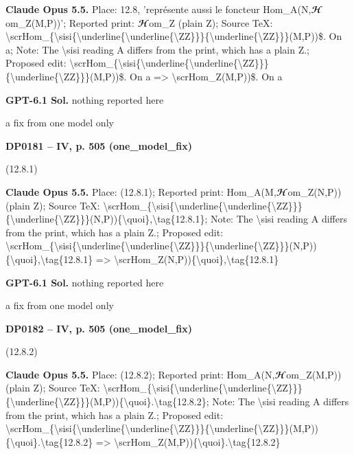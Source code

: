 \textbf{Claude Opus 5.5.} Place: 12.8, 'représente aussi le foncteur Hom\_A(N,\ensuremath{𝓗}om\_Z(M,P))'; Reported print: \ensuremath{𝓗}om\_Z (plain Z); Source TeX: \textbackslash{}scrHom\_\{\textbackslash{}sisi\{\textbackslash{}underline\{\textbackslash{}underline\{\textbackslash{}ZZ\}\}\}\{\textbackslash{}underline\{\textbackslash{}ZZ\}\}\}(M,P))\$. On a; Note: The \textbackslash{}sisi reading A differs from the print, which has a plain Z.; Proposed edit: \textbackslash{}scrHom\_\{\textbackslash{}sisi\{\textbackslash{}underline\{\textbackslash{}underline\{\textbackslash{}ZZ\}\}\}\{\textbackslash{}underline\{\textbackslash{}ZZ\}\}\}(M,P))\$. On a =\allowbreak > \textbackslash{}scrHom\_Z(M,P))\$. On a\par
\textbf{GPT-6.1 Sol.} nothing reported here\par
a fix from one model only\par
\par\noindent\hypertarget{DP0181}{}\textbf{DP0181 -- IV, p. 505 (one\_model\_fix)}\par
(12.8.1)\par
\textbf{Claude Opus 5.5.} Place: (12.8.1); Reported print: Hom\_A(M,\ensuremath{𝓗}om\_Z(N,P)) (plain Z); Source TeX: \textbackslash{}scrHom\_\{\textbackslash{}sisi\{\textbackslash{}underline\{\textbackslash{}underline\{\textbackslash{}ZZ\}\}\}\{\textbackslash{}underline\{\textbackslash{}ZZ\}\}\}(N,P))\{\textbackslash{}quoi\},\textbackslash{}tag\{12.8.1\}; Note: The \textbackslash{}sisi reading A differs from the print, which has a plain Z.; Proposed edit: \textbackslash{}scrHom\_\{\textbackslash{}sisi\{\textbackslash{}underline\{\textbackslash{}underline\{\textbackslash{}ZZ\}\}\}\{\textbackslash{}underline\{\textbackslash{}ZZ\}\}\}(N,P))\{\textbackslash{}quoi\},\textbackslash{}tag\{12.8.1\} =\allowbreak > \textbackslash{}scrHom\_Z(N,P))\{\textbackslash{}quoi\},\textbackslash{}tag\{12.8.1\}\par
\textbf{GPT-6.1 Sol.} nothing reported here\par
a fix from one model only\par
\par\noindent\hypertarget{DP0182}{}\textbf{DP0182 -- IV, p. 505 (one\_model\_fix)}\par
(12.8.2)\par
\textbf{Claude Opus 5.5.} Place: (12.8.2); Reported print: Hom\_A(N,\ensuremath{𝓗}om\_Z(M,P)) (plain Z); Source TeX: \textbackslash{}scrHom\_\{\textbackslash{}sisi\{\textbackslash{}underline\{\textbackslash{}underline\{\textbackslash{}ZZ\}\}\}\{\textbackslash{}underline\{\textbackslash{}ZZ\}\}\}(M,P))\{\textbackslash{}quoi\}.\textbackslash{}tag\{12.8.2\}; Note: The \textbackslash{}sisi reading A differs from the print, which has a plain Z.; Proposed edit: \textbackslash{}scrHom\_\{\textbackslash{}sisi\{\textbackslash{}underline\{\textbackslash{}underline\{\textbackslash{}ZZ\}\}\}\{\textbackslash{}underline\{\textbackslash{}ZZ\}\}\}(M,P))\{\textbackslash{}quoi\}.\textbackslash{}tag\{12.8.2\} =\allowbreak > \textbackslash{}scrHom\_Z(M,P))\{\textbackslash{}quoi\}.\textbackslash{}tag\{12.8.2\}\par
